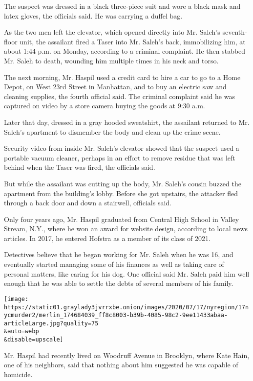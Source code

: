 The suspect was dressed in a black three-piece suit and wore a black
mask and latex gloves, the officials said. He was carrying a duffel bag.

As the two men left the elevator, which opened directly into Mr. Saleh's
seventh-floor unit, the assailant fired a Taser into Mr. Saleh's back,
immobilizing him, at about 1:44 p.m. on Monday, according to a criminal
complaint. He then stabbed Mr. Saleh to death, wounding him multiple
times in his neck and torso.

The next morning, Mr. Haspil used a credit card to hire a car to go to a
Home Depot, on West 23rd Street in Manhattan, and to buy an electric saw
and cleaning supplies, the fourth official said. The criminal complaint
said he was captured on video by a store camera buying the goods at 9:30
a.m.

Later that day, dressed in a gray hooded sweatshirt, the assailant
returned to Mr. Saleh's apartment to dismember the body and clean up the
crime scene.

Security video from inside Mr. Saleh's elevator showed that the suspect
used a portable vacuum cleaner, perhaps in an effort to remove residue
that was left behind when the Taser was fired, the officials said.

But while the assailant was cutting up the body, Mr. Saleh's cousin
buzzed the apartment from the building's lobby. Before she got upstairs,
the attacker fled through a back door and down a stairwell, officials
said.

Only four years ago, Mr. Haspil graduated from Central High School in
Valley Stream, N.Y., where he won an award for website design, according
to local news articles. In 2017, he entered Hofstra as a member of its
class of 2021.

Detectives believe that he began working for Mr. Saleh when he was 16,
and eventually started managing some of his finances as well as taking
care of personal matters, like caring for his dog. One official said Mr.
Saleh paid him well enough that he was able to settle the debts of
several members of his family.

\texttt{[image: https://static01.graylady3jvrrxbe.onion/images/2020/07/17/nyregion/17nycmurder2/merlin\_174684039\_ff8c8003-b39b-4085-98c2-9ee11433abaa-articleLarge.jpg?quality=75\\\&auto=webp\\\&disable=upscale]}

Mr. Haspil had recently lived on Woodruff Avenue in Brooklyn, where Kate
Hain, one of his neighbors, said that nothing about him suggested he was
capable of homicide.

